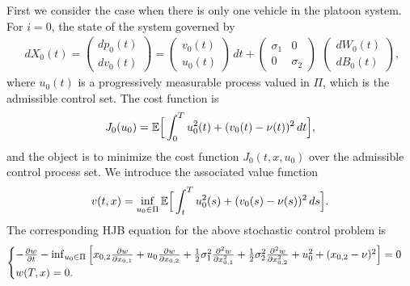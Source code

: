 \documentclass{article}
\begin{document}
First we consider the case when there is only one vehicle in the platoon system. For $i = 0$, the state of the system governed by
\begin{equation} \label{node danamic, N = 0}
\begin{array}{c}
d  X_{0}(t) =
  \left(   \begin{array}{c}
    d  p_{0}(t) \\
    d  v_{0}(t)
  \end{array}   \right)  = 
\left(    \begin{array}{c}
    v_{0}(t) \\
    u_{0}(t)
  \end{array}   \right) \, d t + 
\left(   \begin{array}{cc}
    \sigma_{1} &  0 \\
    0 & \sigma_{2}
  \end{array}   \right)
\end{array}
\left(    \begin{array}{c}
   d W_{0}(t) \\
   d B_{0}(t)
  \end{array}   \right),
\end{equation}
where $u_{0}(t)$ is a progressively measurable process valued in $\Pi$, which is the admissible control set. The cost function is
\begin{equation*}
    J_{0} (u_{0}) = \mathbb{E} \Big{[} \int_{0}^{T} u_{0}^{2}(t) + (v_{0}(t) - \nu(t))^{2} \, d t \Big{]},
\end{equation*}
and the object is to minimize the cost function $J_{0} (t, x, u_{0})$ over the admissible control process set. We introduce the associated value function
\begin{equation*}
    v(t, x) = \inf_{u_{0} \in \Pi} \mathbb{E} \Big{[} \int_{t}^{T} u_{0}^{2}(s) + (v_{0} (s) - \nu(s))^{2} \, d s \Big{]}.
\end{equation*}
The corresponding HJB equation for the above stochastic control problem is 
\begin{equation} \label{HJB, N=0}
    \begin{cases}
   - \frac{\partial w}{\partial t} - \inf_{u_{0} \in \Pi} \Big{[} x_{0,2} \frac{\partial w}{\partial x_{0, 1}} + u_{0} \frac{\partial w}{\partial x_{0, 2}} + \frac{1}{2} \sigma_{1}^{2} \frac{\partial^{2} w}{\partial x_{0, 1}^{2}} + \frac{1}{2} \sigma_{2}^{2} \frac{\partial^{2} w}{\partial x_{0, 2}^{2}} + u_{0}^{2} + (x_{0,2} - \nu)^{2} \Big{]}   = 0  \\
   w(T, x) = 0.
   \end{cases}
\end{equation}
\end{document}
